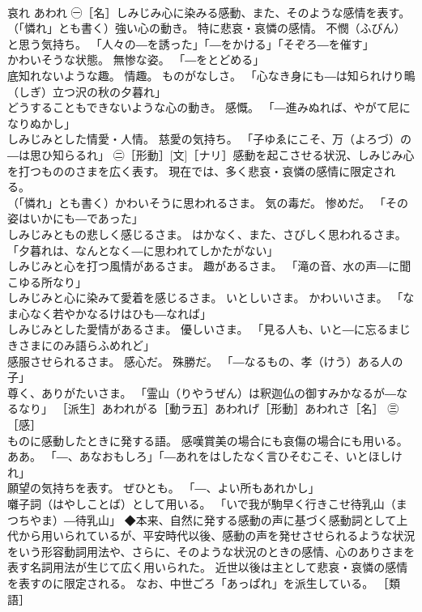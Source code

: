 \documentclass[8pt]{extreport}
\begin{document}
\begin{CJK}{UTF8}{min}
\\	哀れ	あわれ	㊀［名］しみじみ心に染みる感動、また、そのような感情を表す。 
\\	（「憐れ」とも書く）強い心の動き。 特に悲哀・哀憐の感情。 不憫（ふびん）と思う気持ち。 「人々の―を誘った」「―をかける」「そぞろ―を催す」 
\\	かわいそうな状態。 無惨な姿。 「―をとどめる」 
\\	底知れないような趣。 情趣。 ものがなしさ。 「心なき身にも―は知られけり鴫（しぎ）立つ沢の秋の夕暮れ」 
\\	どうすることもできないような心の動き。 感慨。 「―進みぬれば、やがて尼になりぬかし」 
\\	しみじみとした情愛・人情。 慈愛の気持ち。 「子ゆゑにこそ、万（よろづ）の―は思ひ知らるれ」 ㊁［形動］[文]［ナリ］感動を起こさせる状況、しみじみ心を打つもののさまを広く表す。 現在では、多く悲哀・哀憐の感情に限定される。 
\\	（「憐れ」とも書く）かわいそうに思われるさま。 気の毒だ。 惨めだ。 「その姿はいかにも―であった」 
\\	しみじみともの悲しく感じるさま。 はかなく、また、さびしく思われるさま。 「夕暮れは、なんとなく―に思われてしかたがない」 
\\	しみじみと心を打つ風情があるさま。 趣があるさま。 「滝の音、水の声―に聞こゆる所なり」 
\\	しみじみと心に染みて愛着を感じるさま。 いとしいさま。 かわいいさま。 「なま心なく若やかなるけはひも―なれば」 
\\	しみじみとした愛情があるさま。 優しいさま。 「見る人も、いと―に忘るまじきさまにのみ語らふめれど」 
\\	感服させられるさま。 感心だ。 殊勝だ。 「―なるもの、孝（けう）ある人の子」 
\\	尊く、ありがたいさま。 「霊山（りやうぜん）は釈迦仏の御すみかなるが―なるなり」 ［派生］あわれがる［動ラ五］あわれげ［形動］あわれさ［名］ ㊂［感］ 
\\	ものに感動したときに発する語。 感嘆賞美の場合にも哀傷の場合にも用いる。 ああ。 「―、あなおもしろ」「―あれをはしたなく言ひそむこそ、いとほしけれ」 
\\	願望の気持ちを表す。 ぜひとも。 「―、よい所もあれかし」 
\\	囃子詞（はやしことば）として用いる。 「いで我が駒早く行きこせ待乳山（まつちやま）―待乳山」 ◆本来、自然に発する感動の声に基づく感動詞として上代から用いられているが、平安時代以後、感動の声を発せさせられるような状況をいう形容動詞用法や、さらに、そのような状況のときの感情、心のありさまを表す名詞用法が生じて広く用いられた。 近世以後は主として悲哀・哀憐の感情を表すのに限定される。 なお、中世ごろ「あっぱれ」を派生している。 ［類語］ 

\end{CJK}
\end{document}
